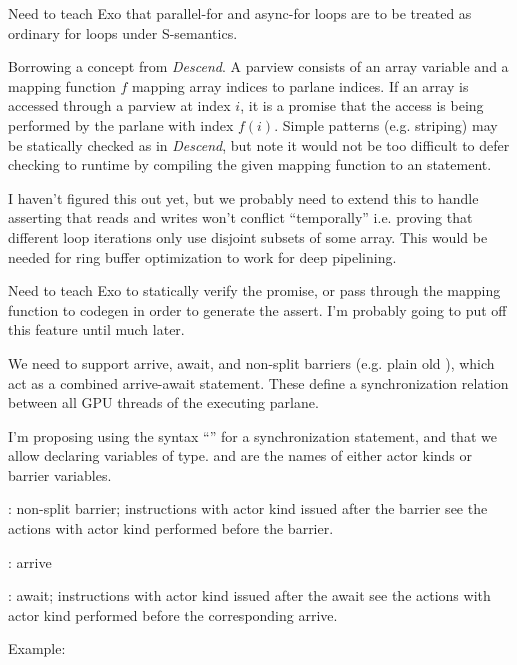  Need to teach Exo that parallel-for and async-for loops are to be treated as ordinary for loops under S-semantics.

\filbreak
{} Borrowing a concept from \textit{Descend}.
A parview consists of an array variable and a mapping function $f$ mapping array indices to parlane indices.
If an array is accessed through a parview at index $i$, it is a promise that the access is being performed by the parlane with index $f(i)$.
Simple patterns (e.g. striping) may be statically checked as in \textit{Descend}, but note it would not be too difficult to defer checking to runtime by compiling the given mapping function to an  statement.

I haven't figured this out yet, but we probably need to extend this to handle asserting that reads and writes won't conflict ``temporally'' i.e. proving that different loop iterations only use disjoint subsets of some array.
This would be needed for ring buffer optimization to work for deep pipelining.

 Need to teach Exo to statically verify the promise, or pass through the mapping function to codegen in order to generate the assert.
I'm probably going to put off this feature until much later.

\filbreak
{} We need to support arrive, await, and non-split barriers (e.g. plain old ), which act as a combined arrive-await statement.
These define a synchronization relation between all GPU threads of the executing parlane.

I'm proposing using the syntax ``'' for a synchronization statement, and that we allow declaring variables of  type.  and  are the names of either actor kinds or barrier variables.

: non-split barrier; instructions with actor kind  issued after the barrier see the actions with actor kind  performed before the barrier.

: arrive

: await; instructions with actor kind  issued after the await see the actions with actor kind  performed before the corresponding arrive.

\filbreak
Example:

